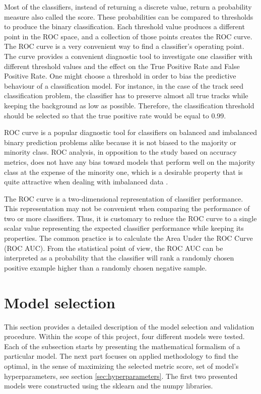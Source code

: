Most of the classifiers, instead of returning a discrete value, return a probability measure also called the score. These probabilities can be compared to thresholds to produce the binary classification.  Each threshold value produces a different point in the ROC space, and a collection of those points creates the ROC curve. The ROC curve is a very convenient way to find a classifier's operating point. 
The curve provides a convenient diagnostic tool to investigate one classifier with different threshold values and the effect on the True Positive Rate and False Positive Rate. One might choose a threshold in order to bias the predictive behaviour of a classification model. For instance, in the case of the track seed classification problem, the classifier has to preserve almost all true tracks while keeping the background as low as possible. Therefore, the classification threshold should be selected so that the true positive rate would be equal to 0.99.  

ROC curve is a popular diagnostic tool for classifiers on balanced and imbalanced binary prediction problems alike because it is not biased to the majority or minority class. ROC analysis, in opposition to the study based on accuracy metrics, does not have any bias toward models that perform well on the majority class at the expense of the minority one, which is a desirable property that is quite attractive when dealing with imbalanced data \cite{imbalanced_learnig}.

The ROC curve is a two-dimensional representation of classifier performance. This representation may not be convenient when comparing the performance of two or more classifiers.  
 Thus, it is customary to reduce the ROC curve to a single scalar value representing the expected classifier performance while keeping its properties. The common practice is to calculate the Area Under the ROC Curve (ROC AUC).  From the statistical point of view, the ROC AUC can be interpreted as a probability that the classifier will rank a randomly chosen positive example higher than a randomly chosen negative sample. 

\section{Model selection}

This section provides a detailed description of the model selection and validation procedure. Within the scope of this project, four different models were tested. Each of the subsection starts by presenting the mathematical formalism of a particular model. The next part focuses on applied methodology to find the optimal, in the sense of maximizing the selected metric score, set of model's hyperparameters, see section \ref{sec:hyperparameters}. 
The first two presented models were constructed using the sklearn \cite{sklearn} and the numpy \cite{numpy} libraries. 


